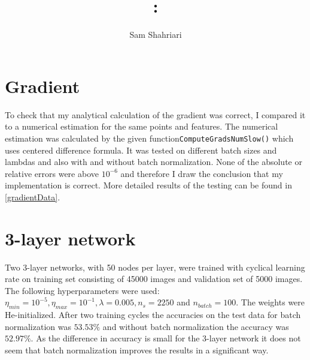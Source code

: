 \documentclass[12pt, a4paper]{article}
\author{Sam Shahriari}
\title{\course: \assignment}
\begin{document}
\maketitle
\section{Gradient}
To check that my analytical calculation of the gradient was correct, I compared it to a numerical estimation for the same points and features. The numerical estimation was calculated by the given function\texttt{ComputeGrads\-NumSlow()} which uses centered difference formula. It was tested on different batch sizes and lambdas and also with and without batch normalization. None of the absolute or relative errors were above $10^{-6}$ and therefore I draw the conclusion that my implementation is correct.
More detailed results of the testing can be found in \autoref{gradientData}.
\section{3-layer network}
Two 3-layer networks, with 50 nodes per layer, were trained with cyclical learning rate on training set consisting of 45000 images and validation set of 5000 images. The following hyperparameters were used: $\eta_{min} = 10^{-5}, \eta_{max} = 10^{-1}, \lambda=0.005, n_s = 2250 $ and $n_{batch}=100$. The weights were He-initialized. After two training cycles the accuracies on the test data for batch normalization was $53.53\%$ and without batch normalization the accuracy was $52.97\%$. As the difference in accuracy is small for the 3-layer network it does not seem that batch normalization improves the results in a significant way.
\end{document}
